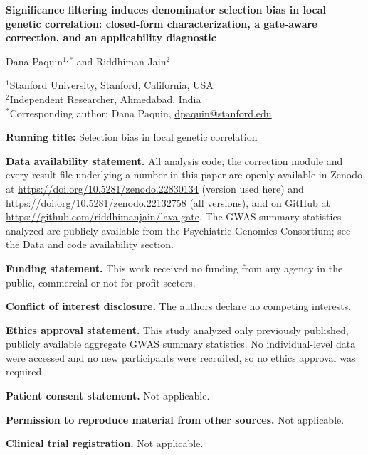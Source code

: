 \documentclass[12pt,a4paper]{article}
\begin{document}
\linenumbers
\onehalfspacing

\begin{titlepage}
\begin{singlespacing}
\begin{center}
{\LARGE\bfseries Significance filtering induces denominator selection bias in local genetic
correlation: closed-form characterization, a gate-aware correction, and an applicability
diagnostic\par}
\vspace{1.2cm}
{\large Dana Paquin$^{1,*}$ and Riddhiman Jain$^{2}$\par}
\vspace{0.6cm}
{\small
$^{1}$Stanford University, Stanford, California, USA\\
$^{2}$Independent Researcher, Ahmedabad, India\\[6pt]
$^{*}$Corresponding author: Dana Paquin, \href{mailto:dpaquin@stanford.edu}{dpaquin@stanford.edu}\par}
\end{center}
\vspace{0.8cm}

\noindent\textbf{Running title:} Selection bias in local genetic correlation

\medskip
\noindent\textbf{Data availability statement.} All analysis code, the correction module and
every result file underlying a number in this paper are openly available in Zenodo at
\url{https://doi.org/10.5281/zenodo.22830134} (version used here) and
\url{https://doi.org/10.5281/zenodo.22132758} (all versions), and on GitHub at
\url{https://github.com/riddhimanjain/lava-gate}. The GWAS summary statistics analyzed are
publicly available from the Psychiatric Genomics Consortium; see the Data and code
availability section.

\medskip
\noindent\textbf{Funding statement.} This work received no funding from any agency in the
public, commercial or not-for-profit sectors.

\medskip
\noindent\textbf{Conflict of interest disclosure.} The authors declare no competing interests.

\medskip
\noindent\textbf{Ethics approval statement.} This study analyzed only previously published,
publicly available aggregate GWAS summary statistics. No individual-level data were
accessed and no new participants were recruited, so no ethics approval was required.

\medskip
\noindent\textbf{Patient consent statement.} Not applicable.

\medskip
\noindent\textbf{Permission to reproduce material from other sources.} Not applicable.

\medskip
\noindent\textbf{Clinical trial registration.} Not applicable.
\end{singlespacing}
\end{titlepage}
\end{document}
